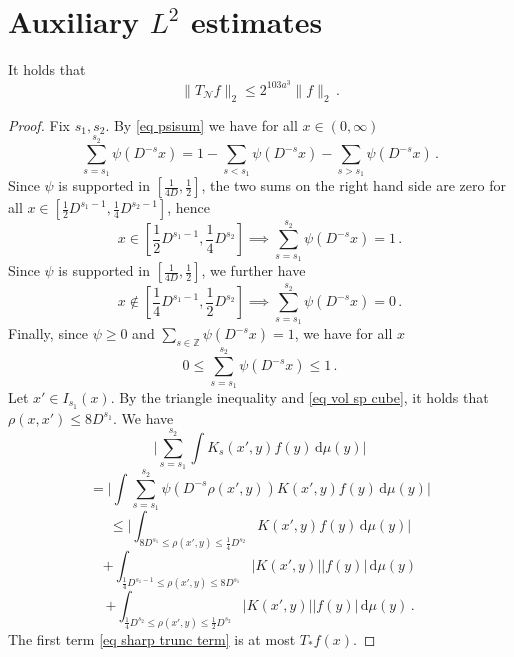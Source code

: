 \section{Auxiliary \texorpdfstring{$L^2$}{L2} estimates}

\begin{lemma}
    \label{lem nontangential}
    It holds that 
    $$
        \|T_{\mathcal{N}} f\|_2 \le 2^{103a^3} \|f\|_2\,.
    $$
\end{lemma}

\begin{proof}
    Fix $s_1, s_2$. By \eqref{eq psisum} we have for all $x \in (0, \infty)$
    $$
        \sum_{s = s_1}^{s_2} \psi(D^{-s}x) = 1 - \sum_{s < s_1} \psi(D^{-s}x) - \sum_{s > s_1} \psi(D^{-s}x)\,.
    $$
    Since $\psi$ is supported in $[\frac{1}{4D}, \frac{1}{2}]$, the two sums on the right hand side are zero for all $x \in [\frac{1}{2}D^{s_1-1}, \frac{1}{4} D^{s_2 - 1}]$, hence
    $$
        x \in  [\frac{1}{2}D^{s_1-1}, \frac{1}{4} D^{s_2}] \implies \sum_{s = s_1}^{s_2} \psi(D^{-s}x) = 1\,.
    $$
    Since $\psi$ is supported in $[\frac{1}{4D}, \frac{1}{2}]$, we further have
    $$
        x \notin [\frac{1}{4}D^{s_1 - 1}, \frac{1}{2}D^{s_2}] \implies \sum_{s = s_1}^{s_2} \psi(D^{-s}x) = 0\,.
    $$
    Finally, since $\psi \ge 0$ and $\sum_{s \in \mathbb{Z}} \psi(D^{-s}x) = 1$, we have for all $x$
    $$
        0 \le \sum_{s = s_1}^{s_2} \psi(D^{-s}x) \le 1\,.
    $$
    Let $x' \in I_{s_1}(x)$. By the triangle inequality and \eqref{eq vol sp cube}, it holds that $\rho(x,x') \le 8D^{s_1}$. We have
    $$
        \Bigg|\sum_{s = s_1}^{s_2} \int K_s(x',y) f(y) \, \mathrm{d}\mu(y)\Bigg|
    $$
    $$
        = \Bigg|\int \sum_{s = s_1}^{s_2} \psi(D^{-s}\rho(x',y)) K(x',y) f(y) \, \mathrm{d}\mu(y)\Bigg|
    $$
    \begin{equation}
        \label{eq sharp trunc term}
        \le \Bigg| \int_{8D^{s_1} \le \rho(x',y) \le \frac{1}{4}D^{s_2}} K(x',y) f(y) \, \mathrm{d}\mu(y) \Bigg|
    \end{equation}
    \begin{equation}
        \label{eq lower bound term}
        + \int_{\frac{1}{4}D^{s_1-1} \le \rho(x',y) \le 8D^{s_1}} |K(x', y)| |f(y)| \, \mathrm{d}\mu(y)
    \end{equation}
    \begin{equation}
        \label{eq upper bound term}
        + \int_{\frac{1}{4}D^{s_2} \le \rho(x',y) \le \frac{1}{2}D^{s_2}} |K(x', y)| |f(y)| \, \mathrm{d}\mu(y)\,.
    \end{equation}
    The first term \eqref{eq sharp trunc term} is at most $T_* f(x)$.


\end{proof}
